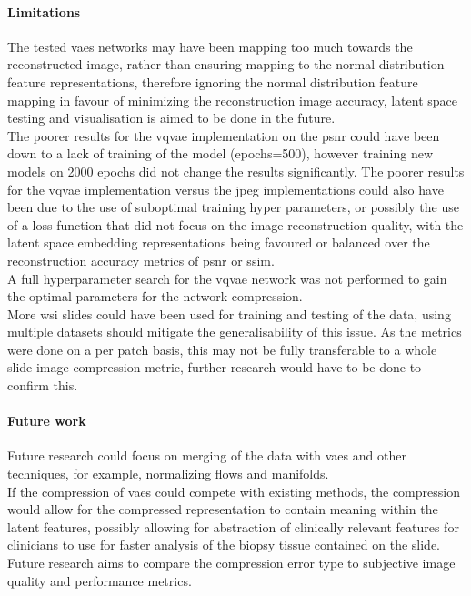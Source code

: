 \documentclass[review]{elsarticle}
\begin{document}
\paragraph{Limitations} The tested \glspl{vae} networks may have been mapping too much towards the reconstructed image, rather than ensuring mapping to the normal distribution feature representations, therefore ignoring the normal distribution feature mapping in favour of minimizing the reconstruction image accuracy, latent space testing and visualisation is aimed to be done in the future. \\
The poorer results for the \gls{vqvae} implementation on the \gls{psnr} could have been down to a lack of training of the model (epochs=500), however training new models on 2000 epochs did not change the results significantly. The poorer results for the \gls{vqvae} implementation versus the \gls{jpeg} implementations could also have been due to the use of suboptimal training hyper parameters, or possibly the use of a loss function that did not focus on the image reconstruction quality, with the latent space embedding representations being favoured or balanced over the reconstruction accuracy metrics of \gls{psnr} or \gls{ssim}. \\
A full hyperparameter search for the \gls{vqvae} network was not performed to gain the optimal parameters for the network compression. \\
More \gls{wsi} slides could have been used for training and testing of the data, using multiple datasets should mitigate the generalisability of this issue. As the metrics were done on a per patch basis, this may not be fully transferable to a whole slide image compression metric, further research would have to be done to confirm this.

\paragraph{Future work} Future research could focus on merging of the data with \glspl{vae} and other techniques, for example, normalizing flows and manifolds. \\
If the compression of \glspl{vae} could compete with existing methods, the compression would allow for the compressed representation to contain meaning within the latent features, possibly allowing for abstraction of clinically relevant features for clinicians to use for faster analysis of the biopsy tissue contained on the slide. \\
Future research aims to compare the compression error type to subjective image quality and performance metrics. \\
\end{document}
